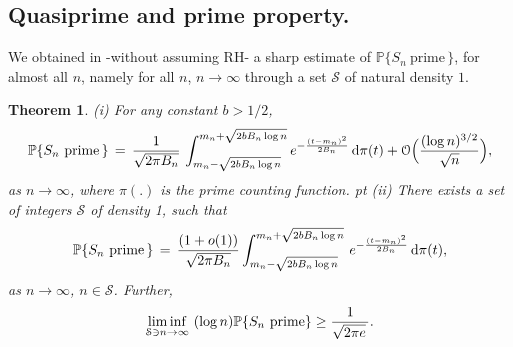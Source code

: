 \documentclass[11pt,draft,reqno]{amsart}
\newtheorem{theorem}{Theorem}[section]
\theoremstyle{definition}
\theoremstyle{remarks}
\numberwithin{equation}{section}
\def \noi{{\noindent}}
\def \dd{{\rm d}}
\def\P{{\mathcal P}}
\def\P{{\mathbb P}}
\begin{document}
\subsection{Quasiprime and prime property.}
We   obtained in   \cite{W8} -without assuming RH- a  sharp estimate  of $\P \{S_n\ \text{prime}\, \}$, for almost all $n$, namely for all $n$, $n\to\infty$ through a set $\mathcal S$  of natural density $1$. 
\begin{theorem}\label{Snprime.M} 
{\rm (i)} For any constant $b>1/2$, 
\begin{equation}\label{Snprime.i}   \P \{S_n\ \text{prime}\, \}
\, =\, \frac{ 1 }{ \sqrt{2\pi  B_n  } }\,\int_{m_n-\sqrt{ 2bB_n\log n}}^{m_n+\sqrt{ 2bB_n\log n}}
 e^{- \frac{(t- m_n)^2}{    2  B_n   } } \, \dd \pi(t)  
    + \mathcal O\Big( \frac{(\log n)^{3/2 }}{\sqrt n} \Big),
  \end{equation}
as $n\to\infty$, where   $\pi(.)$ is the prime counting function.
   pt {\rm (ii)} There exists a set of integers $\mathcal S$ of density 1, such that  \begin{equation}\label{abel.base,}  
 \P \{S_n\ \text{prime}\, \}
\, =\, \frac{ (1+ o( 1) )}{ \sqrt{2\pi  B_n  } } 
\int_{m_n-\sqrt{ 2bB_n\log n}}^{m_n+\sqrt{ 2bB_n\log n}}
  \,  e^{- \frac{(t- m_n)^2}{    2  B_n   } }\, \dd \pi(t),  \end{equation} 
as $n\to \infty$,  $n\in \mathcal S$. Further,
   \begin{equation}\label{abel.base,,}  
\liminf_{  \mathcal S\ni n\to\infty}\ (\log n)\P \{S_n\ \hbox{prime}  \}
\ge  \frac{1  }{  \sqrt{2\pi e}\, } .
   \end{equation}
 \end{theorem} 
\end{document}
